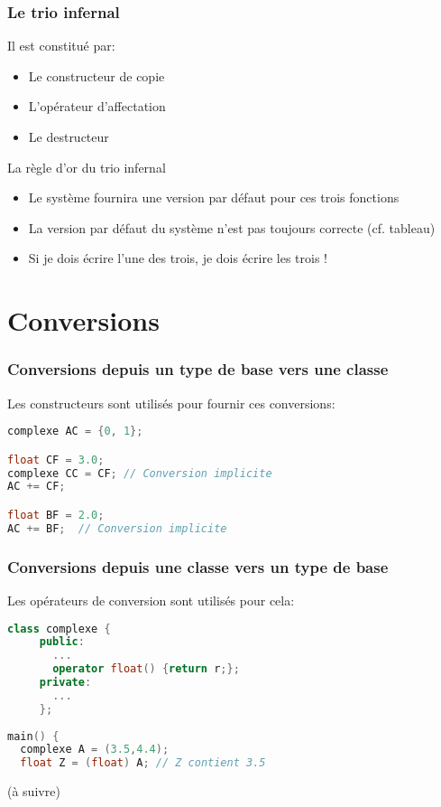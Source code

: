 \documentclass{beamer}
\begin{document}
\begin{frame}[fragile=singleslide,shrink=20]
\frametitle {Le trio infernal}

Il est constitué par:
\begin{itemize}
\item{Le constructeur de copie}
\item{L'opérateur d'affectation}
\item{Le destructeur}
\end{itemize}

\begin{block}{La règle d'or du trio infernal}
\begin{itemize}
\item{Le système fournira une version par défaut pour ces trois fonctions}
\item{La version par défaut du système n'est pas toujours correcte (cf. tableau)}
\item{Si je dois écrire l'une des trois, je dois écrire les trois !}
\end{itemize}
\end{block}
\end{frame}

\section{Conversions}
\begin{frame}[fragile=singleslide,shrink=20]
\frametitle {Conversions depuis un type de base vers une classe}

Les constructeurs sont utilisés pour fournir ces conversions:
\begin{lstlisting}[language=c++]
complexe AC = {0, 1};

float CF = 3.0;
complexe CC = CF; // Conversion implicite
AC += CF;

float BF = 2.0;
AC += BF;  // Conversion implicite
\end{lstlisting}
\end{frame}

\begin{frame}[fragile=singleslide,shrink=20]
\frametitle {Conversions depuis une classe vers un type de base}

Les opérateurs de conversion sont utilisés pour cela:
\begin{lstlisting}[language=c++]
class complexe {
     public:
       ...
       operator float() {return r;};
     private:
       ...
     };
     
main() {
  complexe A = (3.5,4.4);
  float Z = (float) A; // Z contient 3.5
\end{lstlisting}
\end{frame}

\begin{frame}
(à suivre)
\end{frame}
\end{document}
